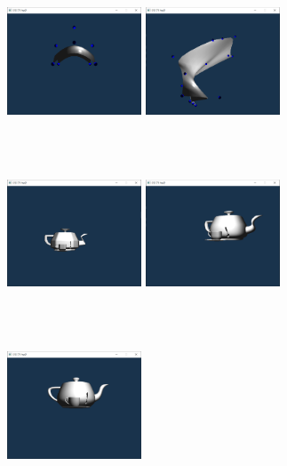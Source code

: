 \documentclass[acmtog]{acmart}
\begin{document}
\begin{figure}[h]
	\centering
	\includegraphics[width=4cm,height=5cm]{bspline1}
	\includegraphics[width=4cm,height=5cm]{bspline2}
	\includegraphics[width=4cm,height=5cm]{degree1}
	\includegraphics[width=4cm,height=5cm]{degree2}
	\includegraphics[width=4cm,height=5cm]{degree3}

\end{figure}
\end{document}
